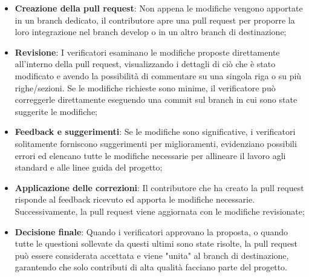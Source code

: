 \begin{itemize}
    \item \textbf{Creazione della pull request}: Non appena le modifiche vengono apportate in un branch dedicato, il contributore apre una pull request per proporre la loro integrazione nel branch develop o in un altro branch di destinazione;
    \item \textbf{Revisione}: I verificatori esaminano le modifiche proposte direttamente all'interno della pull request, visualizzando i dettagli di ciò che è stato modificato e avendo la possibilità di commentare su una singola riga o su più righe/sezioni. Se le modifiche richieste sono minime, il verificatore può correggerle direttamente eseguendo una commit sul branch in cui sono state suggerite le modifiche;
    \item \textbf{Feedback e suggerimenti}: Se le modifiche sono significative, i verificatori solitamente forniscono suggerimenti per miglioramenti, evidenziano possibili errori ed elencano tutte le modifiche necessarie per allineare il lavoro agli standard e alle linee guida del progetto;
    \item \textbf{Applicazione delle correzioni}: Il contributore che ha creato la pull request risponde al feedback ricevuto ed apporta le modifiche necessarie. Successivamente, la pull request viene aggiornata con le modifiche revisionate;
    \item \textbf{Decisione finale}: Quando i verificatori approvano la proposta, o quando tutte le questioni sollevate da questi ultimi sono state risolte, la pull request può essere considerata accettata e viene "unita" al branch di destinazione, garantendo che solo contributi di alta qualità facciano parte del progetto.
\end{itemize}
